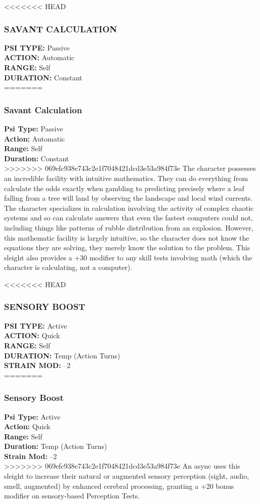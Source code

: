 <<<<<<< HEAD
\subsubsection{SAVANT CALCULATION}
\textbf{PSI TYPE:} Passive \\ 
\textbf{ACTION:} Automatic \\ 
\textbf{RANGE:} Self \\ 
\textbf{DURATION:} Constant \\
=======
\subsubsection{Savant Calculation}
\textbf{Psi Type:} Passive \\ 
\textbf{Action:} Automatic \\ 
\textbf{Range:} Self \\ 
\textbf{Duration:} Constant \\
>>>>>>> 069efc938e743c2e1f7048421dcd3e53a984f73e
The character possesses an incredible facility with
intuitive mathematics. They can do everything from
calculate the odds exactly when gambling to predicting
precisely where a leaf falling from a tree will land
by observing the landscape and local wind currents.
The character specializes in calculation involving the
activity of complex chaotic systems and so can calculate
answers that even the fastest computers could not,
including things like patterns of rubble distribution
from an explosion. However, this mathematic facility
is largely intuitive, so the character does not know the
equations they are solving, they merely know the solution
to the problem.
This sleight also provides a +30 modifier to any
skill tests involving math (which the character is calculating,
not a computer).

<<<<<<< HEAD
\subsubsection{SENSORY BOOST}
\textbf{PSI TYPE:} Active \\ 
\textbf{ACTION:} Quick \\ 
\textbf{RANGE:} Self \\ 
\textbf{DURATION:} Temp (Action Turns) \\
\textbf{STRAIN MOD:} –2 \\
=======
\subsubsection{Sensory Boost}
\textbf{Psi Type:} Active \\ 
\textbf{Action:} Quick \\ 
\textbf{Range:} Self \\ 
\textbf{Duration:} Temp (Action Turns) \\
\textbf{Strain Mod:} –2 \\
>>>>>>> 069efc938e743c2e1f7048421dcd3e53a984f73e
An async uses this sleight to increase their natural or
augmented sensory perception (sight, audio, smell,
augmented) by enhanced cerebral processing, granting
a +20 bonus modifier on sensory-based Perception
Tests.

